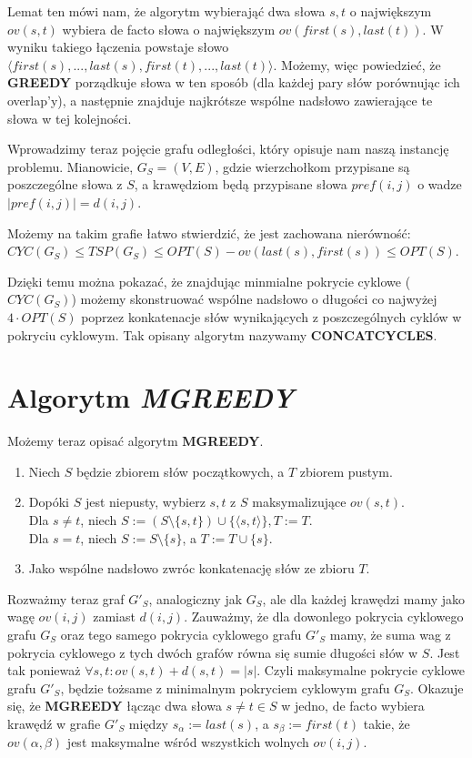 \documentclass[12pt]{article}
\theoremstyle{definition}
\begin{document}
Lemat ten mówi nam, że algorytm wybierająć dwa słowa $s,t$ o największym $ov(s,t)$ wybiera de facto słowa o największym $ov(first(s), last(t))$.
W wyniku takiego łączenia powstaje słowo $\langle first(s),...,last(s),first(t),...,last(t)\rangle$.
Możemy, więc powiedzieć, że \textbf{GREEDY} porządkuje słowa w ten sposób (dla każdej pary słów porównując ich overlap'y), a następnie 
znajduje najkrótsze wspólne nadsłowo zawierające te słowa w tej kolejności.

Wprowadzimy teraz pojęcie grafu odległości, który opisuje nam naszą instancję problemu. Mianowicie,
$G_S = (V,E)$, gdzie wierzchołkom przypisane są poszczególne słowa z $S$, a krawędziom będą przypisane 
słowa $pref(i,j)$ o wadze $|pref(i,j)|=d(i,j)$.

Możemy na takim grafie łatwo stwierdzić, że jest zachowana nierówność: \linebreak
$CYC(G_S) \leq TSP(G_S) \leq OPT(S) - ov(last(s), first(s)) \leq OPT(S)$.

Dzięki temu można pokazać, że znajdując minmialne pokrycie cyklowe ($CYC(G_S)$) możemy skonstruować wspólne nadsłowo o długości co najwyżej $4 \cdot OPT(S)$ poprzez konkatenacje 
słów wynikających z poszczególnych cyklów w pokryciu cyklowym. Tak opisany algorytm nazywamy \textbf{CONCATCYCLES}.

\section*{Algorytm \textit{\textbf{MGREEDY}}}
Możemy teraz opisać algorytm \textbf{MGREEDY}.
\begin{enumerate}
  \item Niech $S$ będzie zbiorem słów początkowych, a $T$ zbiorem pustym.
  \item Dopóki $S$ jest niepusty, wybierz $s,t$ z $S$ maksymalizujące $ov(s,t)$.\\
  Dla $s\neq t$, niech $S := (S \setminus \{s, t\}) \cup \{\langle s, t \rangle\}, T := T$.\\
  Dla $s = t$, niech $S := S \setminus \{s\}$, a $T := T \cup \{s\}$. 
  \item Jako wspólne nadsłowo zwróc konkatenację słów ze zbioru $T$.
\end{enumerate}

Rozważmy teraz graf $G'_S$, analogiczny jak $G_S$, ale dla każdej krawędzi mamy jako wagę $ov(i,j)$ zamiast $d(i,j)$.
Zauważmy, że dla dowonlego pokrycia cyklowego grafu $G_S$ oraz tego samego pokrycia cyklowego grafu $G'_S$ mamy, że 
suma wag z pokrycia cyklowego z tych dwóch grafów równa się sumie długości słów w $S$. Jest tak ponieważ $\forall s,t: ov(s,t) + d(s,t) =  |s|$. Czyli maksymalne pokrycie cyklowe grafu $G'_S$, będzie tożsame z
minimalnym pokryciem cyklowym grafu $G_S$. Okazuje się, że \textbf{MGREEDY} łącząc dwa słowa $s\neq t \in S$ w jedno, de facto 
wybiera krawędź w grafie $G'_S$ między $s_\alpha := last(s)$, a $s_\beta := first(t)$ takie, że $ov(\alpha, \beta)$ jest maksymalne wśród wszystkich wolnych $ov(i,j)$.
\end{document}
